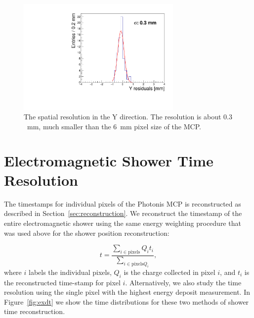 \documentclass[12pt]{article}
\begin{document}
{\begin{figure}[htbp]
	\centering
	\includegraphics[width=8cm]{Images/sres/sres_cutoff.pdf}
	\caption{\small The spatial resolution in the Y direction. The resolution is
about $0.3$~mm, much smaller than the $6$~mm pixel
size of the MCP.}
	\label{fig:sres}
\end{figure}



\section{ Electromagnetic Shower Time Resolution }

The timestamps for individual pixels of the Photonis MCP is reconstructed as
described in Section~\ref{sec:reconstruction}. We reconstruct the timestamp of
the entire electromagnetic shower using the same energy weighting procedure that
was used above for the shower position reconstruction:

\begin{equation} t =\frac{\sum_{i\in\mathrm{pixels}} Q_{i} t_{i}}
{\sum_{i\in\mathrm{pixels} Q_{i}}}, \label{eqn:EnergyWeightedTimestamp}
\end{equation} where $i$ labels the individual pixels, $Q_{i}$ is the charge
collected in pixel $i$, and $t_{i}$ is the reconstructed time-stamp for pixel
$i$. Alternatively, we also study the time resolution using the single pixel
with the highest energy deposit measurement. In Figure~\ref{fig:exdt} we show
the time distributions for these two methods of shower time reconstruction.

}
\end{document}
